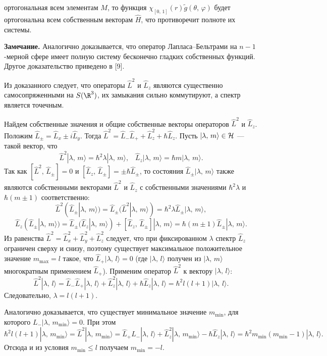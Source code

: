 \documentclass[a4paper
]{article}
\begin{document}
ортогональная всем элементам $M$, то функция ${\chi}_{[0, \, 1]}(r)
\tilde g(\theta, \, \varphi)$ будет ортогональна всем собственным
векторам $\hat H$, что противоречит полноте их системы. \par
{\bf Замечание.} Аналогично доказывается, что оператор Лапласа--Бельтрами
на $n-1$-мерной сфере имеет полную систему бесконечно гладких
собственных функций. Другое доказательство приведено в [9]. \par
Из доказанного следует, что операторы $\hat L^2$ и $\hat L_z$ являются
существенно самосопряженными на $S(\R^3)$, их замыкания сильно
коммутируют, а спектр является точечным. \par
Найдем собственные значения и общие собственные векторы операторов
$\hat{L}^2$ и $\hat L_z$. Положим $\hat{L}_{\pm}=\hat{L}_x\pm i\hat L_y$.
Тогда $\hat{L}^2=\hat{L}_-\hat{L}_++\hat{L}_z^2+\hbar \hat{L}_z$. Пусть
$|\lambda, \, m\rangle\in {\cal H}$ --- такой вектор, что
$$\hat{L}^2|\lambda, \, m\rangle=\hbar^2\lambda|\lambda, \, m\rangle,
\; \; \; \hat{L}_z|\lambda, \, m\rangle=\hbar m|\lambda, \, m\rangle.$$ Так как
$[\hat{L}^2, \, \hat{L}_\pm]=0$ и $[\hat{L}_z, \, \hat{L}_{\pm}]=\pm
\hbar \hat L_\pm$, то состояния $\hat L_\pm|\lambda, \, m\rangle$
также являются собственными векторами $\hat{L}^2$ и $\hat{L}_z$ с собственными
значениями $\hbar^2\lambda$ и $\hbar(m\pm 1)$ соответственно:
$$\hat{L}^2(\hat{L}_\pm|\lambda, \, m\rangle)=\hat{L}_\pm(\hat{L}^2
|\lambda, \, m\rangle)=\hbar^2 \lambda\hat L_\pm|\lambda, \, m\rangle,$$
$$\hat{L}_z(\hat{L}_\pm|\lambda, \, m\rangle)=\hat{L}_\pm(\hat{L}_z
|\lambda, \, m\rangle)+[\hat{L}_z, \, \hat{L}_\pm]|\lambda, \, m\rangle=
\hbar (m\pm 1)\hat L_\pm|\lambda, \, m\rangle.$$ Из равенства
$\hat L^2=\hat L^2_x+\hat L^2_y+\hat{L}_z^2$ следует, что при
фиксированном $\lambda$ спектр $\hat{L}_z$ ограничен сверху и снизу,
поэтому существует максимальное положительное значение $m_{\max}=l$ такое,
что $\hat{L}_+|\lambda, \, l\rangle=0$ (где $|\lambda, \, l\rangle$ получен
из $|\lambda, \, m\rangle$ многократным применением $\hat{L}_+$). Применим
оператор $\hat{L}^2$ к вектору $|\lambda, \, l\rangle$:
$$\hat{L}^2|\lambda, \, l\rangle=\hat{L}_-\hat{L}_+|\lambda, \, l\rangle+
\hat{L}_z^2|\lambda, \, l\rangle+\hbar \hat{L}_z|\lambda, \, l\rangle =
\hbar ^2l(l+1)|\lambda, \, l\rangle.$$ Следовательно, $\lambda=l(l+1)$. \par
Аналогично доказывается, что существует минимальное значение $m_{\min}$,
для которого $L_-|\lambda, \, m_{\min}\rangle=0$. При этом $$\hbar^2l(l+1)
|\lambda, \, m_{\min}\rangle=\hat{L}^2|\lambda, \, m_{\min}\rangle =
\hat{L}_+\hat{L}_-|\lambda, \, l\rangle+\hat{L}_z^2|\lambda, \, m_{\min}
\rangle-\hbar \hat{L}_z|\lambda, \, l\rangle=\hbar ^2 m_{\min}(m_{\min}-1)
|\lambda,\, l\rangle.$$ Отсюда и из условия $m_{\min}\le l$ получаем $m_{\min}=-l$.
\end{document}
